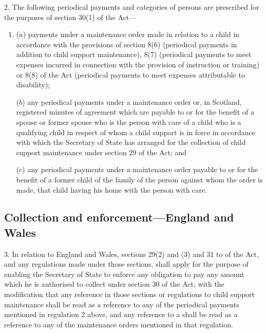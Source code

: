 \documentclass[12pt,a4paper]{article}
\begin{document}
2.  The following periodical payments and categories of persons are prescribed for the purposes of section 30(1) of the Act—
\begin{enumerate}\item[]
($a$) payments under a maintenance order made in relation to a child in accordance with the provisions of section 8(6) (periodical payments in addition to child support maintenance), 8(7) (periodical payments to meet expenses incurred in connection with the provision of instruction or training) or 8(8) of the Act (periodical payments to meet expenses attributable to disability);

($b$) any periodical payments under a maintenance order 
or, in Scotland, registered minutes of agreement %
which are payable to or for the benefit of a spouse or former spouse who is the person with care of a child who is a qualifying child in respect of whom a child support 
is in force in accordance with which the Secretary of State has arranged for the collection of child support maintenance under section 29 of the Act; and

($c$) any periodical payments under a maintenance order payable to or for the benefit of a former child of the family of the person against whom the order is made, that child having his home with the person with care.
\end{enumerate}


\subsection[3. Collection and enforcement—England and Wales]{Collection and enforcement—England and Wales}

3.  In relation to England and Wales, sections 29(2) and (3) and 31 to 
of the Act, and any regulations made under those sections, shall apply for the purpose of enabling the Secretary of State to enforce any obligation to pay any amount which he is authorised to collect under section 30 of the Act, with the modification that any reference in those sections or regulations to child support maintenance shall be read as a reference to any of the periodical payments mentioned in regulation 2 above, and any reference to a 
shall be read as a reference to any of the maintenance orders mentioned in that regulation.
\end{document}
